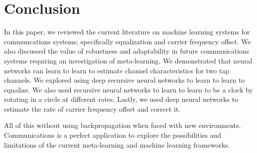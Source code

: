 \chapter{Conclusion}

In this paper, we reviewed the current literature on machine learning systems for communcations systems; specifically equalization and carrier frequency offset.  We also discussed the value of robustness and adaptability in future communications systems requiring an investigation of meta-learning.
We demonstrated that neural networks can learn to learn to estimate channel characteristics for two tap channels.  We explored using deep recursive neural networks to learn to learn to equalize.
We also used recursive neural networks to learn to learn to be a clock by rotating in a circle at different rates.  Lastly, we used deep neural networks to estimate the rate of carrier frequency offset and correct it.

All of this without using backpropagation when faced with new environments.
Communications is a perfect application to explore the possibilities and limitations of the current meta-learning and machine learning frameworks.  
